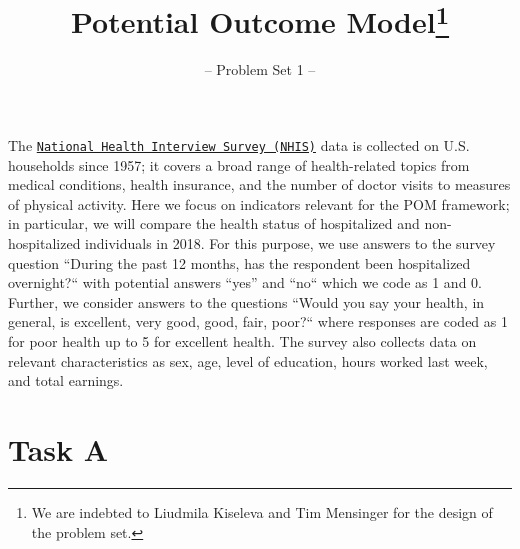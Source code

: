 

\title{Potential Outcome Model\thanks{We are indebted to Liudmila Kiseleva and Tim Mensinger for the design of the problem set.}}
\subtitle{-- Problem Set 1 --}
\date{}

\maketitle\vspace{-2cm}

The \href{https://www.cdc.gov/nchs/nhis/index.htm}{\texttt{National Health Interview Survey (NHIS)}} data is collected on U.S. households since 1957; it covers a broad range of health-related topics from medical conditions, health insurance, and the number of doctor visits to measures of physical activity. Here we focus on indicators relevant for the POM framework; in particular, we will compare the health status of hospitalized and non-hospitalized individuals in 2018.
For this purpose, we use answers to the survey question ``During the past 12 months, has the respondent been hospitalized overnight?`` with potential answers ``yes'' and ``no`` which we code as 1 and 0. Further, we consider answers to the questions ``Would you say your health, in general, is excellent, very good, good, fair, poor?`` where responses are coded as 1 for poor health up to 5 for excellent health. The survey also collects data on relevant characteristics as sex, age, level of education, hours worked last week, and total earnings.

\section*{Task A} 

